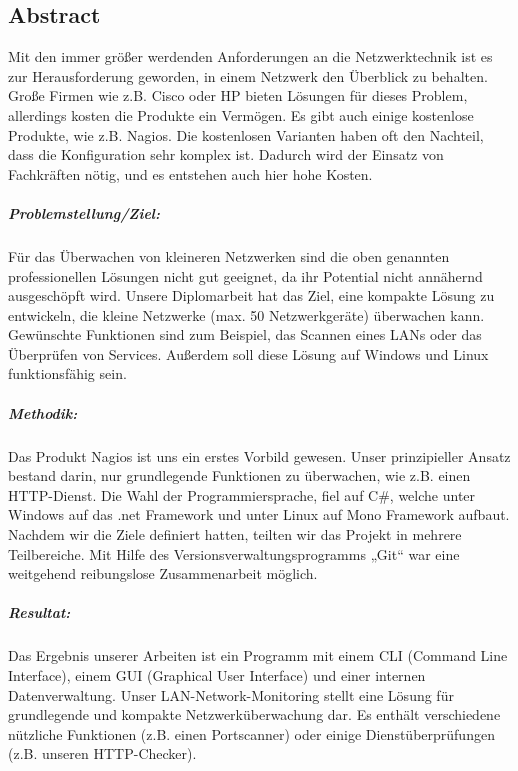 \documentclass[12pt,a4paper]{report}
\begin{document}
\begin{onehalfspace}
\chapter{Abstract}
Mit den immer größer werdenden Anforderungen an die Netzwerktechnik ist es zur Herausforderung geworden, in einem Netzwerk den Überblick zu behalten. Große Firmen wie z.B. Cisco oder HP bieten Lösungen für dieses Problem, allerdings kosten die Produkte ein Vermögen. Es gibt auch einige kostenlose Produkte, wie z.B. Nagios. Die kostenlosen Varianten haben oft den Nachteil, dass die Konfiguration sehr komplex ist. Dadurch wird der Einsatz von Fachkräften nötig, und es entstehen auch hier hohe Kosten.
\paragraph{Problemstellung/Ziel:} Für das Überwachen von kleineren Netzwerken sind die oben genannten professionellen Lösungen nicht gut geeignet, da ihr Potential nicht annähernd ausgeschöpft wird. Unsere Diplomarbeit hat das Ziel, eine kompakte Lösung zu entwickeln, die kleine Netzwerke (max. 50 Netzwerkgeräte) überwachen kann. Gewünschte Funktionen sind zum Beispiel, das Scannen eines LANs oder das Überprüfen von Services. Außerdem soll diese Lösung auf Windows und Linux funktionsfähig sein.
\paragraph{Methodik:}Das Produkt Nagios ist uns ein erstes Vorbild gewesen. Unser prinzipieller Ansatz bestand darin, nur grundlegende Funktionen zu überwachen, wie z.B. einen HTTP-Dienst.
Die Wahl der Programmiersprache, fiel auf C\#, welche unter Windows auf das .net Framework und unter Linux auf Mono Framework aufbaut. Nachdem wir die Ziele definiert hatten, teilten wir das Projekt in mehrere Teilbereiche. Mit Hilfe des Versionsverwaltungsprogramms „Git“ war eine weitgehend reibungslose Zusammenarbeit möglich.
\paragraph{Resultat:} Das Ergebnis unserer Arbeiten ist ein Programm mit einem CLI (Command Line Interface), einem GUI (Graphical User Interface) und einer internen Datenverwaltung. Unser  LAN-Network-Monitoring stellt eine Lösung für grundlegende und kompakte Netzwerküberwachung dar. Es enthält verschiedene nützliche Funktionen (z.B. einen Portscanner) oder einige Dienstüberprüfungen (z.B. unseren HTTP-Checker). 

\end{onehalfspace}
\end{document}
